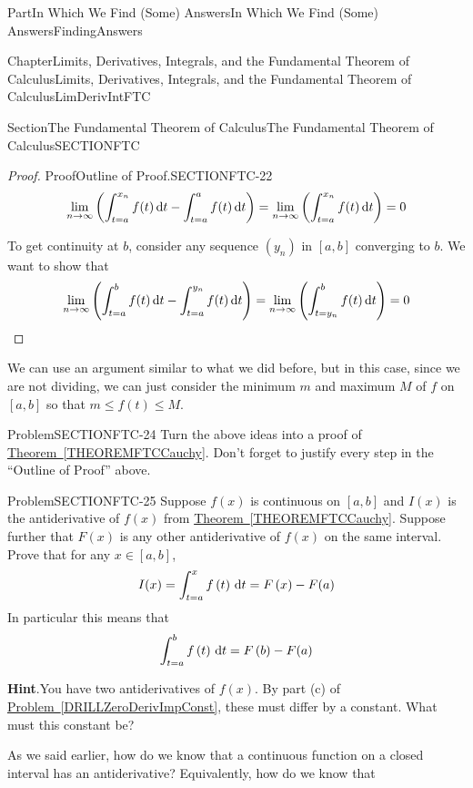 \documentclass[oneside,10pt,]{book}
\newcommand{\blocktitlefont}{\relax}
\newcommand{\xreffont}{\relax}
\numberwithin{equation}{part}
\newcommand{\dx}[1]{\,{\rm d}#1}
\def\limit#1#2#3{{\displaystyle\lim_{#1\rightarrow #2}#3}}
\begin{document}
\begin{partptx}{Part}{In Which We Find (Some) Answers}{}{In Which We Find (Some) Answers}{}{}{FindingAnswers}
\begin{chapterptx}{Chapter}{Limits, Derivatives, Integrals, and the Fundamental Theorem of Calculus}{}{Limits, Derivatives, Integrals, and the Fundamental Theorem of Calculus}{}{}{LimDerivIntFTC}
\begin{sectionptx}{Section}{The Fundamental Theorem of Calculus}{}{The Fundamental Theorem of Calculus}{}{}{SECTIONFTC}
\begin{proof}{Proof}{Outline of Proof.}{SECTIONFTC-22}
\begin{equation*}
\limit{n}{\infty }{\left(\int^{x_n}_{t=a}{f(t)\dx{t}}-\int^a_{t=a}{f(t)\dx{t}}\right)}
=\limit{n}{\infty }{
\left(\int^{x_n}_{t=a}{f(t)\dx{t}}\right)}=0 
\end{equation*}
%
\par
To get continuity at \(b\), consider any sequence \(\left(y_n\right)\) in \([a,b]\) converging to \(b\).  We want to show that%
\begin{equation*}
\limit{n}{ \infty }
{\left(\int^b_{t=a}{f(t)\dx{t}}-\int^{y_n}_{t=a}{f(t)\dx{t}}\right)
}=\limit{n}{\infty } {\left(\int^b_{t=y_n}{f(t)\dx{t}}\right)}=0
\end{equation*}
%
\end{proof}
We can use an argument similar to what we did before, but in this case, since we are not dividing, we can just consider the minimum \(m\) and maximum \(M\) of \(f\) on \([a,b]\) so that \(m\le f\left(t\right)\le M\).%
\begin{problem}{Problem}{}{SECTIONFTC-24}%
Turn the above ideas into a proof of \hyperref[THEOREMFTCCauchy]{Theorem~{\xreffont\ref{THEOREMFTCCauchy}}}. Don't forget to justify every step in the ``Outline of Proof'' above.%
\end{problem}
\begin{problem}{Problem}{}{SECTIONFTC-25}%
Suppose \(f(x)\) is continuous on \([a,b]\) and \(I(x)\) is the antiderivative of \(f(x)\) from  \hyperref[THEOREMFTCCauchy]{Theorem~{\xreffont\ref{THEOREMFTCCauchy}}}. Suppose further that \(F(x)\) is any other antiderivative of \(f(x)\) on the same interval. Prove that for any \(x\in [a,b]\),%
\begin{equation*}
I(x)=\int^x_{t=a}{f\left(t\right)\dx{t}}=F\left(x\right)-F(a)
\end{equation*}
In particular this means that%
\begin{equation*}
\int^b_{t=a}{f\left(t\right)\dx{t}}=F\left(b\right)-F(a)
\end{equation*}
%
\par\smallskip%
\noindent\textbf{\blocktitlefont Hint}.\hypertarget{SECTIONFTC-25-2}{}\quad{}You have two antiderivatives of \(f(x)\).  By part (c) of \hyperref[DRILLZeroDerivImpConst]{Problem~{\xreffont\ref{DRILLZeroDerivImpConst}}}, these must differ by a constant.  What must this constant be?%
\end{problem}
As we said earlier, how do we know that a continuous function on a closed interval has an antiderivative?  Equivalently, how do we know that%
\begin{equation*}

\end{equation*}
\end{sectionptx}
\end{chapterptx}
\end{partptx}
\end{document}
